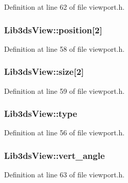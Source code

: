 Definition at line 62 of file viewport.\-h.

\hypertarget{struct_lib3ds_view_a1795efaf50246f332b85157e63a50484}{
\subsubsection[{position}]{ Lib3ds\-View\-::position\mbox{[}2\mbox{]}}}\label{struct_lib3ds_view_a1795efaf50246f332b85157e63a50484}


Definition at line 58 of file viewport.\-h.

\hypertarget{struct_lib3ds_view_a60f64c4ed0a32a00202b58d462a528ce}{
\subsubsection[{size}]{ Lib3ds\-View\-::size\mbox{[}2\mbox{]}}}\label{struct_lib3ds_view_a60f64c4ed0a32a00202b58d462a528ce}


Definition at line 59 of file viewport.\-h.

\hypertarget{struct_lib3ds_view_a107ef91905268d5ffeeb79f16312342d}{
\subsubsection[{type}]{ Lib3ds\-View\-::type}}\label{struct_lib3ds_view_a107ef91905268d5ffeeb79f16312342d}


Definition at line 56 of file viewport.\-h.

\hypertarget{struct_lib3ds_view_adf23c4b2d4070ae1479ecf61031dfae3}{
\subsubsection[{vert\-\_\-angle}]{ Lib3ds\-View\-::vert\-\_\-angle}}\label{struct_lib3ds_view_adf23c4b2d4070ae1479ecf61031dfae3}


Definition at line 63 of file viewport.\-h.

